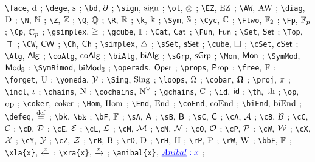 \verb|\face|, $\operatorname{d}$ ; 
\verb|\dege|, $\operatorname{s}$ ; 
\verb|\bd|, $\operatorname{\partial}$ ; 
\verb|\sign|, $\operatorname{sign}$ ; 
\verb|\ot|, $\otimes$ ; 
\verb|\EZ|, $\operatorname{EZ}$ ; 
\verb|\AW|, $\operatorname{AW}$ ; 
\verb|\diag|, $\mathrm{D}$ ; 
\verb|\N|, $\mathbb{N}$ ; 
\verb|\Z|, $\mathbb{Z}$ ; 
\verb|\Q|, $\mathbb{Q}$ ; 
\verb|\R|, $\mathbb{R}$ ; 
\verb|\k|, $\Bbbk$ ; 
\verb|\Sym|, $\mathbb{S}$ ; 
\verb|\Cyc|, $\mathbb{C}$ ; 
\verb|\Ftwo|, ${\mathbb{F}_2}$ ; 
\verb|\Fp|, ${\mathbb{F}_p}$ ; 
\verb|\Cp|, ${\mathbb{C}_p}$ ; 
\verb|\gsimplex|, $\mathbb{\Delta}$ ; 
\verb|\gcube|, $\mathbb{I}$ ; 
\verb|\Cat|, $\mathsf{Cat}$ ; 
\verb|\Fun|, $\mathsf{Fun}$ ; 
\verb|\Set|, $\mathsf{Set}$ ; 
\verb|\Top|, $\Top$ ; 
\verb|\CW|, $\mathsf{CW}$ ; 
\verb|\Ch|, $\mathsf{Ch}$ ; 
\verb|\simplex|, $\triangle$ ; 
\verb|\sSet|, $\mathsf{sSet}$ ; 
\verb|\cube|, $\square$ ; 
\verb|\cSet|, $\mathsf{cSet}$ ; 
\verb|\Alg|, $\mathsf{Alg}$ ; 
\verb|\coAlg|, $\mathsf{coAlg}$ ; 
\verb|\biAlg|, $\mathsf{biAlg}$ ; 
\verb|\sGrp|, $\mathsf{sGrp}$ ; 
\verb|\Mon|, $\mathsf{Mon}$ ; 
\verb|\SymMod|, $\mathsf{Mod}_{\mathbb{S}}$ ; 
\verb|\SymBimod|, $\mathsf{biMod}_{\mathbb{S}}$ ; 
\verb|\operads|, $\mathsf{Oper}$ ; 
\verb|\props|, $\mathsf{Prop}$ ; 
\verb|\free|, $\operatorname{F}$ ; 
\verb|\forget|, $\operatorname{U}$ ; 
\verb|\yoneda|, $\operatorname{\mathcal{Y}}$ ; 
\verb|\Sing|, $\operatorname{Sing}$ ; 
\verb|\loops|, $\Omega$ ; 
\verb|\cobar|, $\operatorname{\mathbf{\Omega}}$ ; 
\verb|\proj|, $\operatorname{\pi}$ ; 
\verb|\incl|, $\operatorname{\iota}$ ; 
\verb|\chains|, $\operatorname{N}$ ; 
\verb|\cochains|, $\operatorname{N^{\vee}}$ ; 
\verb|\gchains|, $\operatorname{C}$ ; 
\verb|\id|, $\mathsf{id}$ ; 
\verb|\th|, $\mathrm{th}$ ; 
\verb|\op|, $\mathrm{op}$ ; 
\verb|\coker|, $\operatorname{coker}$ ; 
\verb|\Hom|, $\mathrm{Hom}$ ; 
\verb|\End|, $\mathrm{End}$ ; 
\verb|\coEnd|, $\mathrm{coEnd}$ ; 
\verb|\biEnd|, $\mathrm{biEnd}$ ; 
\verb|\defeq|, $\stackrel{\mathrm{def}}{=}$ ; 
\verb|\bk|, $\bk$ ; 
\verb|\bF|, $\mathbb{F}$ ; 
\verb|\sA|, $\mathsf{A}$ ; 
\verb|\sB|, $\mathsf{B}$ ; 
\verb|\sC|, $\mathsf{C}$ ; 
\verb|\cA|, $\mathcal{A}$ ; 
\verb|\cB|, $\mathcal{B}$ ; 
\verb|\cC|, $\mathcal{C}$ ; 
\verb|\cD|, $\mathcal{D}$ ; 
\verb|\cE|, $\mathcal{E}$ ; 
\verb|\cL|, $\mathcal{L}$ ; 
\verb|\cM|, $\mathcal{M}$ ; 
\verb|\cN|, $\mathcal{N}$ ; 
\verb|\cO|, $\mathcal{O}$ ; 
\verb|\cP|, $\mathcal{P}$ ; 
\verb|\cW|, $\mathcal{W}$ ; 
\verb|\cX|, $\mathcal{X}$ ; 
\verb|\cY|, $\mathcal{Y}$ ; 
\verb|\cZ|, $\mathcal{Z}$ ; 
\verb|\rB|, $\mathrm{B}$ ; 
\verb|\rD|, $\mathrm{D}$ ; 
\verb|\rH|, $\mathrm{H}$ ; 
\verb|\rP|, $\mathrm{P}$ ; 
\verb|\rW|, $\mathrm{W}$ ; 
\verb|\bbF|, $\mathbb{F}$ ; 
\verb|\xla{x}|, $\xleftarrow{x}$ ; 
\verb|\xra{x}|, $\xrightarrow{x}$ ; 
\verb|\anibal{x}|, $\textcolor{blue}{\underline{Anibal}: x}$ ; 
